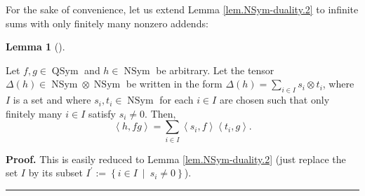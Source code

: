 \documentclass[numbers=enddot,12pt,final,onecolumn,notitlepage]{scrartcl}%
\theoremstyle{definition}
\newtheorem{lem}[theo]{Lemma}
\newenvironment{lemma}[1][]
{\begin{lem}[#1]\begin{leftbar}}
{\end{leftbar}\end{lem}}
\newenvironment{proof}[1][Proof]{\noindent\textbf{#1.} }{\ \rule{0.5em}{0.5em}}
\let\sumnonlimits\sum
\renewcommand{\sum}{\sumnonlimits\limits}
\begin{document}
For the sake of convenience, let us extend Lemma \ref{lem.NSym-duality.2} to
infinite sums with only finitely many nonzero addends:

\begin{lemma}
\label{lem.NSym-duality.2inf}Let $f,g\in\operatorname*{QSym}$ and
$h\in\operatorname*{NSym}$ be arbitrary. Let the tensor $\Delta\left(
h\right)  \in\operatorname*{NSym}\otimes\operatorname*{NSym}$ be written in
the form $\Delta\left(  h\right)  =\sum_{i\in I}s_{i}\otimes t_{i}$, where $I$
is a set and where $s_{i},t_{i}\in\operatorname*{NSym}$ for each $i\in I$ are
chosen such that only finitely many $i\in I$ satisfy $s_{i}\neq0$. Then,%
\[
\left\langle h,fg\right\rangle =\sum_{i\in I}\left\langle s_{i},f\right\rangle
\left\langle t_{i},g\right\rangle .
\]

\end{lemma}

\begin{proof}
This is easily reduced to Lemma \ref{lem.NSym-duality.2} (just replace the set
$I$ by its subset $I^{\prime}:=\left\{  i\in I\ \mid\ s_{i}\neq0\right\}  $).
\end{proof}
\end{document}
